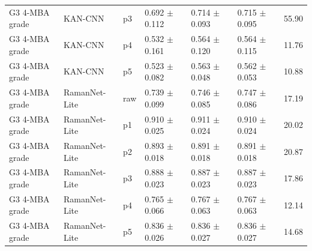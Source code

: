 {\begin{longtable}{L{2.35cm}L{2.4cm}L{1.0cm}L{2.35cm}L{2.25cm}L{2.25cm}L{1.45cm}}
G3 4-MBA grade & KAN-CNN & p3 & 0.692 $\pm$ 0.112 & 0.714 $\pm$ 0.093 & 0.715 $\pm$ 0.095 & 55.90 \\
G3 4-MBA grade & KAN-CNN & p4 & 0.532 $\pm$ 0.161 & 0.564 $\pm$ 0.120 & 0.564 $\pm$ 0.115 & 11.76 \\
G3 4-MBA grade & KAN-CNN & p5 & 0.523 $\pm$ 0.082 & 0.563 $\pm$ 0.048 & 0.562 $\pm$ 0.053 & 10.88 \\
G3 4-MBA grade & RamanNet-Lite & raw & 0.739 $\pm$ 0.099 & 0.746 $\pm$ 0.085 & 0.747 $\pm$ 0.086 & 17.19 \\
G3 4-MBA grade & RamanNet-Lite & p1 & 0.910 $\pm$ 0.025 & 0.911 $\pm$ 0.024 & 0.910 $\pm$ 0.024 & 20.02 \\
G3 4-MBA grade & RamanNet-Lite & p2 & 0.893 $\pm$ 0.018 & 0.891 $\pm$ 0.018 & 0.891 $\pm$ 0.018 & 20.87 \\
G3 4-MBA grade & RamanNet-Lite & p3 & 0.888 $\pm$ 0.023 & 0.887 $\pm$ 0.023 & 0.887 $\pm$ 0.023 & 17.86 \\
G3 4-MBA grade & RamanNet-Lite & p4 & 0.765 $\pm$ 0.066 & 0.767 $\pm$ 0.063 & 0.767 $\pm$ 0.063 & 12.14 \\
G3 4-MBA grade & RamanNet-Lite & p5 & 0.836 $\pm$ 0.026 & 0.836 $\pm$ 0.027 & 0.836 $\pm$ 0.027 & 14.68 \\
\end{longtable}
}


